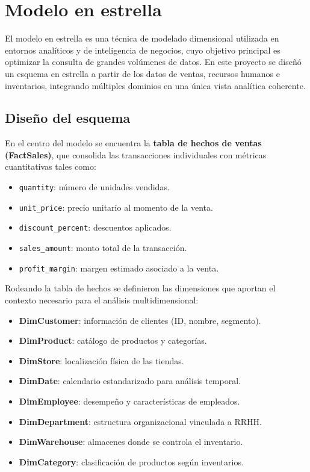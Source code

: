 \documentclass[12pt,a4paper]{article}
\begin{document}
\section{Modelo en estrella}

El modelo en estrella es una técnica de modelado dimensional utilizada en entornos 
analíticos y de inteligencia de negocios, cuyo objetivo principal es optimizar la 
consulta de grandes volúmenes de datos. En este proyecto se diseñó un esquema en 
estrella a partir de los datos de ventas, recursos humanos e inventarios, 
integrando múltiples dominios en una única vista analítica coherente.

\subsection{Diseño del esquema}
En el centro del modelo se encuentra la \textbf{tabla de hechos de ventas (FactSales)}, 
que consolida las transacciones individuales con métricas cuantitativas tales como:
\begin{itemize}
    \item \texttt{quantity}: número de unidades vendidas.
    \item \texttt{unit\_price}: precio unitario al momento de la venta.
    \item \texttt{discount\_percent}: descuentos aplicados.
    \item \texttt{sales\_amount}: monto total de la transacción.
    \item \texttt{profit\_margin}: margen estimado asociado a la venta.
\end{itemize}

Rodeando la tabla de hechos se definieron las dimensiones que aportan el contexto 
necesario para el análisis multidimensional:
\begin{itemize}
    \item \textbf{DimCustomer}: información de clientes (ID, nombre, segmento).
    \item \textbf{DimProduct}: catálogo de productos y categorías.
    \item \textbf{DimStore}: localización física de las tiendas.
    \item \textbf{DimDate}: calendario estandarizado para análisis temporal.
    \item \textbf{DimEmployee}: desempeño y características de empleados.
    \item \textbf{DimDepartment}: estructura organizacional vinculada a RRHH.
    \item \textbf{DimWarehouse}: almacenes donde se controla el inventario.
    \item \textbf{DimCategory}: clasificación de productos según inventarios.
\end{itemize}
\end{document}
